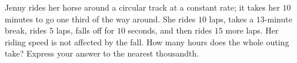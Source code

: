 Jenny rides her horse around a circular track at a constant rate; it takes her $10$ minutes to go one third of the way around. She rides $10$ laps, takes a $13$-minute break, rides $5$ laps, falls off for $10$ seconds, and then rides $15$ more laps. Her riding speed is not affected by the fall. How many hours does the whole outing take? Express your answer to the nearest thousandth.
